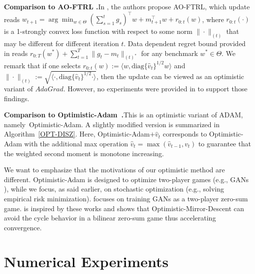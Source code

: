\documentclass[wcp]{jmlr}
\begin{document}
\noindent \textbf{Comparison to AO-FTRL \citep{MY16}.}\hspace{0.1in}In \citep{MY16}, the authors propose AO-FTRL, which update reads $w_{t+1} = \arg\min_{{w \in \Theta}} ( \sum_{s=1}^t g_s )^{\top}  w + m_{t+1}^\top w + r_{0:t}(w) $, where $r_{0:t}(\cdot)$ is a 1-strongly convex loss function with respect to some norm $\| \cdot\|_{(t)}$ that may be different for different iteration $t$. 
Data dependent regret bound provided in \citep{MY16} reads $r_{{0:T}}(w^*) + \sum_{t=1}^T \| g_t - m_t \|_{(t)^*}$ for any benchmark $w^{*} \in \Theta$. 
We remark that if one selects $r_{0:t}(w) := \langle w, \text{diag}\{\hat{v}_t\}^{1/2} w \rangle$  and $\| \cdot \|_{(t)}:=  \sqrt{ \langle \cdot, \text{diag}\{\hat{v}_t\}^{1/2} \cdot \rangle }$, then the update can be viewed as an optimistic variant of $AdaGrad$. 
However, no experiments were provided in \citep{MY16} to support those findings.

\noindent \textbf{Comparison to Optimistic-Adam~\citep{DISZ18}.}This is an optimistic variant of ADAM, namely~Optimistic-Adam. 
A slightly modified version is summarized in Algorithm~\ref{OPT-DISZ}. 
Here, Optimistic-Adam$+\hat{v}_t$ corresponds to Optimistic-Adam with the additional max operation $\hat{v}_t = \max ( \hat{v}_{t-1}, v_t)$ to guarantee that the weighted second moment is monotone increasing.

We want to emphasize that the motivations of our optimistic method are different. 
Optimistic-Adam is designed to optimize two-player games (e.g., GANs \citep{goodfellow2014generative}), while we focus, as said earlier, on stochastic optimization (e.g., solving empirical risk minimization).
\citep{DISZ18} focuses on training GANs as a two-player zero-sum game. 
\citep{DISZ18} is inspired by these works and shows that Optimistic-Mirror-Descent can avoid the cycle behavior in a bilinear zero-sum game thus accelerating convergence. 



\vspace{-0.05in}
\section{Numerical Experiments}\label{sec:numerical}
\vspace{-0.05in}

%
\end{document}

